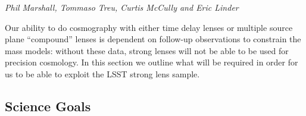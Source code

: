 
\label{sec:sl}

{\it Phil Marshall, Tommaso Treu, Curtis McCully and Eric Linder}

Our ability to do cosmography with either time delay lenses or multiple
source plane ``compound'' lenses is dependent on follow-up observations
to constrain the mass models: without these data, strong lenses will not
be able to be used for precision cosmology. In this section we outline what will be
required in order for us to be able to exploit the LSST strong lens sample.



\subsection{Science Goals}


